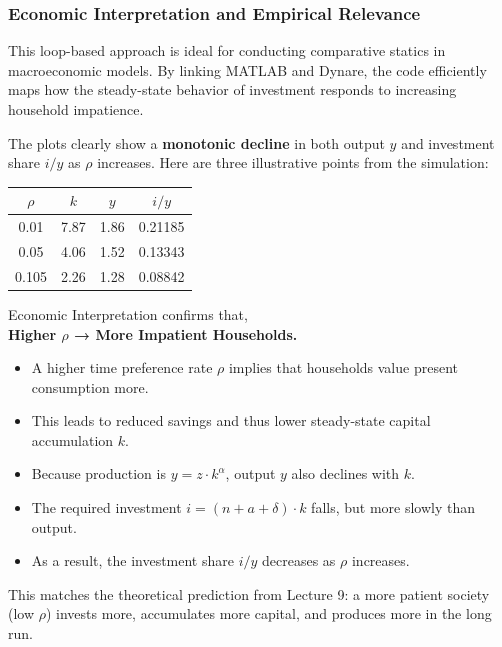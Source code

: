 \documentclass[12pt,a4paper,notitlepage]{article}
\numberwithin{equation}{section}
\begin{document}
\begin{itemize}
\begin{itemize}
\subsubsection {    Economic Interpretation and Empirical Relevance}


This loop-based approach is ideal for conducting comparative statics in macroeconomic models. By linking MATLAB and Dynare, the code efficiently maps how the steady-state behavior of investment responds to increasing household impatience.


\newpage

The plots clearly show a \textbf{monotonic decline}  in both output $y$ and investment share $i/y$ as $\rho$ increases. Here are three illustrative points from the simulation:

\begin{center}
\begin{tabular}{|c|c|c|c|}
\hline
$\rho$ & $k$ & $y$ & $i/y$ \\
\hline
0.01 & 7.87 & 1.86 & 0.21185 \\
0.05 & 4.06 & 1.52 & 0.13343 \\
0.105 & 2.26 & 1.28 & 0.08842 \\
\hline
\end{tabular}
\end{center}
\vspace{1em}

Economic Interpretation confirms that, \\ \textbf{Higher $\rho$ → More Impatient Households.}
\begin{itemize}
    \item A higher time preference rate $\rho$ implies that households value present consumption more.
    \item This leads to reduced savings and thus lower steady-state capital accumulation $k$.
    \item Because production is $y = z \cdot k^\alpha$, output $y$ also declines with $k$.
    \item The required investment $i = (n + a + \delta) \cdot k$ falls, but more slowly than output.
    \item As a result, the investment share $i/y$ decreases as $\rho$ increases.
\end{itemize}

This matches the theoretical prediction from Lecture 9: a more patient society (low $\rho$) invests more, accumulates more capital, and produces more in the long run.


\end{itemize}
\end{itemize}
\end{document}
